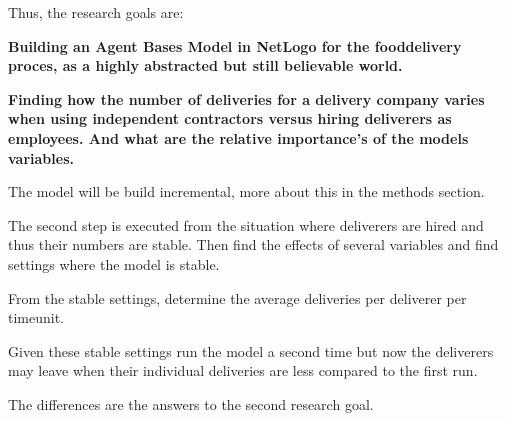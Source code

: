 Thus, the research goals are:

\textbf{Building an Agent Bases Model in NetLogo for the fooddelivery proces, as a highly abstracted but still believable world.}

\textbf{Finding how the number of deliveries for a delivery company varies when using independent contractors versus hiring deliverers as employees.
 And what are the relative importance's of the models variables.}


The model will be build incremental, more about this in the methods section.

The second step is executed from the situation where deliverers are hired and thus their numbers are stable.
Then find the effects of several variables and find settings where the model is stable.

From the stable settings, determine the average deliveries per deliverer per timeunit.

Given these stable settings run the model a second time but now the deliverers may leave when their individual deliveries are less
compared to the first run.

The differences are the answers to the second research goal.



